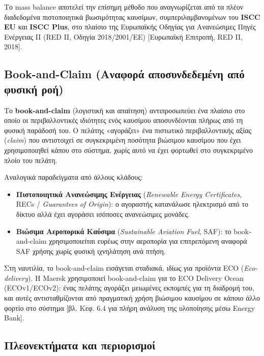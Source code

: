 Το mass balance αποτελεί την επίσημη μέθοδο που αναγνωρίζεται από τα
πλέον διαδεδομένα πιστοποιητικά βιωσιμότητας καυσίμων,
συμπεριλαμβανομένων του \textbf{ISCC EU} και \textbf{ISCC Plus}, στο
πλαίσιο της Ευρωπαϊκής Οδηγίας για Ανανεώσιμες Πηγές Ενέργειας II (RED
II, Οδηγία 2018/2001/ΕΕ) {[}Ευρωπαϊκή Επιτροπή, RED II, 2018{]}.

\subsection{Book-and-Claim (Αναφορά αποσυνδεδεμένη από φυσική
ροή)}\label{book-and-claim-ux3b1ux3bdux3b1ux3c6ux3bfux3c1ux3ac-ux3b1ux3c0ux3bfux3c3ux3c5ux3bdux3b4ux3b5ux3b4ux3b5ux3bcux3adux3bdux3b7-ux3b1ux3c0ux3cc-ux3c6ux3c5ux3c3ux3b9ux3baux3ae-ux3c1ux3bfux3ae}

Το \textbf{book-and-claim} (λογιστική και απαίτηση) αντιπροσωπεύει ένα
πλαίσιο στο οποίο οι περιβαλλοντικές ιδιότητες ενός καυσίμου
αποσυνδέονται πλήρως από τη φυσική παράδοσή του. Ο πελάτης «αγοράζει»
ένα πιστωτικό περιβαλλοντικής αξίας (\emph{claim}) που αντιστοιχεί σε
συγκεκριμένη ποσότητα βιώσιμου καυσίμου που έχει χρησιμοποιηθεί κάπου
στο σύστημα, χωρίς αυτό να έχει φορτωθεί στο συγκεκριμένο πλοίο του
πελάτη.

Αναλογικά παραδείγματα από άλλους κλάδους:

\begin{itemize}
\tightlist
\item
  \textbf{Πιστοποιητικά Ανανεώσιμης Ενέργειας} (\emph{Renewable Energy
  Certificates}, RECs / \emph{Guarantees of Origin}): ο αγοραστής
  κατανάλωσε ηλεκτρισμό από το δίκτυο αλλά έχει αγοράσει ισόποσες
  ανανεώσιμες μονάδες.
\item
  \textbf{Βιώσιμα Αεροπορικά Καύσιμα} (\emph{Sustainable Aviation Fuel},
  SAF): το book-and-claim χρησιμοποιείται ευρέως στην αεροπορία για
  επιτρεπόμενη αναφορά SAF χρήσης χωρίς φυσική ιχνηλάτηση ανά πτήση.
\end{itemize}

Στη ναυτιλία, το book-and-claim εισάγεται σταδιακά, ιδίως για προϊόντα
ECO (\emph{Eco-delivery}). Η Maersk χρησιμοποιεί book-and-claim για το
ECO Delivery Ocean (ECOv1/ECOv2): ένας πελάτης αγοράζει μειωμένες
εκπομπές για τη διαδρομή του, και αυτές αντισταθμίζονται από πραγματική
χρήση βιώσιμου καυσίμου σε κάποιο άλλο φορτίο στο σύστημα {[}βλ. Κεφ.
6.4 για πλήρη ανάλυση της υλοποίησης μέσω Energy Bank{]}.

\subsection{Πλεονεκτήματα και
περιορισμοί}\label{ux3c0ux3bbux3b5ux3bfux3bdux3b5ux3baux3c4ux3aeux3bcux3b1ux3c4ux3b1-ux3baux3b1ux3b9-ux3c0ux3b5ux3c1ux3b9ux3bfux3c1ux3b9ux3c3ux3bcux3bfux3af}

